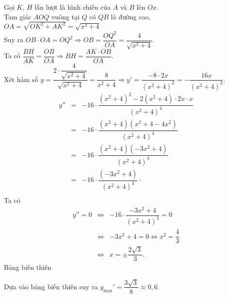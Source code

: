 \begin{ex}
{\begin{center}
\end{center}
Gọi $K$, $H$ lần lượt là hình chiếu của $A$ và $B$ lên $Ox$.\\ Tam giác $AOQ$ vuông tại $Q$ có $QB$ là đường cao, $O A=\sqrt{O K^2+A K^2}=\sqrt{x^2+4}$\\
Suy ra $ O B \cdot O A=O Q^2  \Rightarrow O B=\dfrac{O Q^2}{O A}=\dfrac{4}{\sqrt{x^2+4}}$.\\
Ta có  $\dfrac{B H}{A K}=\dfrac{O B}{O A}  \Rightarrow B H=\dfrac{A K \cdot O B}{O A}$.\\
Xét hàm số $y=\dfrac{2 \cdot \dfrac{4}{\sqrt{x^2+4}}}{\sqrt{x^2+4}}=\dfrac{8}{x^2+4}\Rightarrow y'=\dfrac{-8 \cdot 2 x}{\left(x^2+4\right)^2}=-\dfrac{16 x}{\left(x^2+4\right)^2} . $
\begin{eqnarray*}
y''&=&-16 \cdot \dfrac{\left(x^2+4\right)^2-2\left(x^2+4\right) \cdot 2 x \cdot x}{\left(x^2+4\right)^4}\\
& =&-16 \cdot \dfrac{\left(x^2+4\right)\left(x^2+4-4 x^2\right)}{\left(x^2+4\right)^4} \\
& =&-16 \cdot \dfrac{\left(x^2+4\right)\left(-3 x^2+4\right)}{\left(x^2+4\right)^4} \\
& =&-16 \cdot \dfrac{\left(-3 x^2+4\right)}{\left(x^2+4\right)^3} \cdot \\
\end{eqnarray*}
Ta có \begin{eqnarray*}
y''=0 &\Leftrightarrow&-16 \cdot \dfrac{-3 x^2+4}{\left(x^2+4\right)^3}=0 \\
& \Leftrightarrow&-3 x^2+4=0 \Leftrightarrow x^2=\dfrac{4}{3} \\
& \Leftrightarrow& x= \pm \dfrac{2 \sqrt{3}}{3} .
\end{eqnarray*}
Bảng biến thiên
\begin{center}
\end{center}
Dựa vào bảng biến thiên suy ra $y_{\max }'=\dfrac{3 \sqrt{3}}{8} \approx 0{,}6$.
}
\end{ex}

